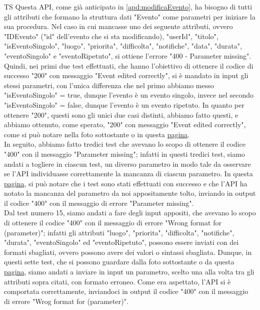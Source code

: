 \begin{listaPersonale}{TS}
                Questa API, come già anticipato in \ref{apd:modificaEvento}, ha bisogno di tutti gli attributi che formano la struttura dati "Evento" come parametri per iniziare la sua procedura. Nel caso in cui mancasse uno dei seguente attributi, ovvero "IDEvento" ("id" dell'evento che si sta modificando), "userId", "titolo", "isEventoSingolo", "luogo", "priorita", "difficolta", "notifiche", "data", "durata", "eventoSingolo" e "eventoRipetuto", si ottiene l'errore "400 - Parameter missing". Quindi, nei primi due test effettuati, che hanno l'obiettivo di ottenere il codice di successo "200" con messaggio "Event edited correctly", si è mandato in input gli stessi parametri, con l'unica differenza che nel primo abbiamo messo "isEventoSingolo" = true, dunque l'evento è un evento singolo, invece nel secondo "isEventoSingolo" = false, dunque l'evento è un evento ripetuto. In quanto per ottenere "200", questi sono gli unici due casi distinti, abbiamo fatto questi, e abbiamo ottenuto, come sperato, "200" con messaggio "Event edited correctly", come si può notare nella foto sottostante o in questa  \href{https://plan-it.it/test-report.html} {pagina}. \\
                In seguito, abbiamo fatto tredici test che avevano lo scopo di ottenere il codice "400" con il messaggio "Parameter missing"; infatti in questi tredici test, siamo andati a togliere in ciascun test, un diverso parametro in modo tale da osservare se l'API individuasse correttamente la mancanza di ciascun parametro. In questa \href{https://plan-it.it/test-report.html} {pagina}, si può notare che i test sono stati effettuati con successo e che l'API ha notato la mancanza del parametro da noi appositamente tolto, inviando in output il codice "400" con il messaggio di errore "Parameter missing". \\
                Dal test numero 15, siamo andati a fare degli input appositi, che avevano lo scopo di ottenere il codice "400" con il messaggio di errore "Wrong format for (parameter)";  infatti gli attributi "luogo", "priorita", "difficolta", "notifiche", "durata", "eventoSingolo" ed "eventoRipetuto", possono essere inviati con dei formati sbagliati, ovvero possono avere dei valori o sintassi sbagliata. Dunque, in questi sette test, che si possono guardare dalla foto sottostante o da questa \href{https://plan-it.it/test-report.html} {pagina}, siamo andati a inviare in input un parametro, scelto una alla volta tra gli attributi sopra citati, con formato erroneo. Come era aspettato, l'API si è comportata correttamente, inviandoci in output il codice "400" con il messaggio di errore "Wrog format for (parameter)".\\

\end{listaPersonale}
